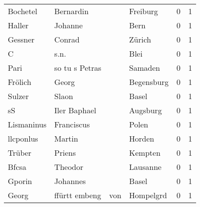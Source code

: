 \begin{tabular}{llllrr}
                 Bochetel &                          Bernardin &             &                                    Freiburg &          0 &         1 \\
                   Haller &                            Johanne &             &                                        Bern &          0 &         1 \\
                  Gessner &                             Conrad &             &                                      Zürich &          0 &         1 \\
                        C &                               s.n. &             &                                        Blei &          0 &         1 \\
                     Pari &                     so tu s Petras &             &                                     Samaden &          0 &         1 \\
                  Frölich &                              Georg &             &                                  Begensburg &          0 &         1 \\
                   Sulzer &                              Slaon &             &                                       Basel &          0 &         1 \\
                       sS &                       Iler Baphael &             &                                    Augsburg &          0 &         1 \\
               Lismaninus &                         Franciscus &             &                                       Polen &          0 &         1 \\
                llcponlus &                             Martin &             &                                      Horden &          0 &         1 \\
                   Trüber &                             Priens &             &                                     Kempten &          0 &         1 \\
                    Bfcsa &                            Theodor &             &                                    Lausanne &          0 &         1 \\
                   Gporin &                           Johannes &             &                                       Basel &          0 &         1 \\
                    Georg &                      ffürtt embeng &         von &                                   Hompelgrd &          0 &         1 \\

\end{tabular}

